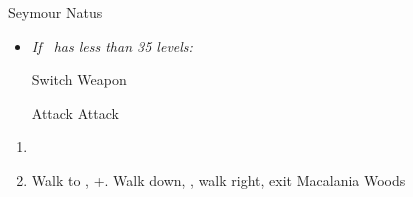 \begin{battle}[36000]{Seymour Natus}
	\begin{itemize}
		\item \textit{If \lulu\ has less than 35 levels:}
		      \begin{itemize}
			      \switch{\tidus}{\lulu}
			      \luluf Switch Weapon
			      \switch{\lulu}{\tidus}
		      \end{itemize}
		      \tidusf Attack
		      \summon{\bahamut}
		      \bahamutf Attack
	\end{itemize}
\end{battle}
\begin{enumerate}[resume]
	\item \sd
	\item Walk to \yuna, \cs+\skippablefmv[10:10]. Walk down, \cs[1:40], walk right, exit Macalania Woods
\end{enumerate}